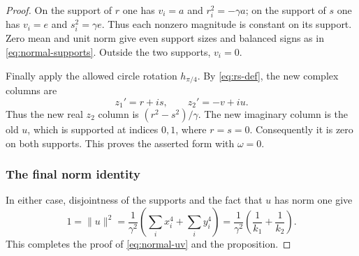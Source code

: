 \documentclass[11pt,reqno]{amsart}
\theoremstyle{definition}
\theoremstyle{remark}
\numberwithin{equation}{section}
\newcommand{\norm}[1]{\lVert #1\rVert}
\begin{document}
\begin{proof}
On the support of $r$ one has $v_i=a$ and $r_i^2=-\gamma a$;
on the support of $s$ one has $v_i=e$ and $s_i^2=\gamma e$.
Thus each nonzero magnitude is constant on its support. Zero mean
and unit norm give even support sizes and balanced signs as in
\eqref{eq:normal-supports}. Outside the two supports, $v_i=0$.

Finally apply the allowed circle rotation $h_{\pi/4}$. By
\eqref{eq:rs-def}, the new complex columns are
\[
 z_1'=r+is,\qquad z_2'=-v+iu.
\]
Thus the new real $z_2$ column is $(r^2-s^2)/\gamma$.
The new imaginary column is the old $u$, which is supported at
indices $0,1$, where $r=s=0$. Consequently it is zero on both
supports. This proves the asserted form with $\omega=0$.

\subsubsection*{The final norm identity}
In either case, disjointness of the supports and the fact that
$u$ has norm one give
\[
 1=\norm u^2
  =\frac1{\gamma^2}
     \left(\sum_i x_i^4+\sum_i y_i^4\right)
  =\frac1{\gamma^2}\left(\frac1{k_1}+\frac1{k_2}\right).
\]
This completes the proof of \eqref{eq:normal-uv} and the proposition.
\end{proof}
\end{document}
